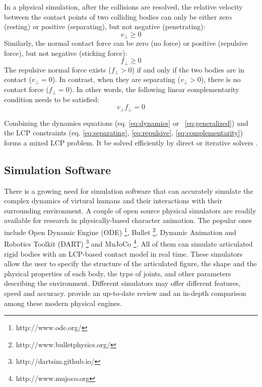 In a physical simulation, after the collisions are resolved, the relative velocity between the contact points of two colliding bodies can only be either zero (resting) or positive (separating), but not negative (penetrating):
\begin{equation}
v_\perp\geq 0
\label{eq:separating}
\end{equation}
Similarly, the normal contact force can be zero (no force) or positive (repulsive force), but not negative (sticking force):
\begin{equation}
f_\perp \geq 0
\label{eq:repulsive}
\end{equation}
The repulsive normal force exists ($f_\perp>0$) if and only if the two bodies are in contact ($v_\perp=0$). In contrast, when they are separating ($v_\perp>0$), there is no contact force ($f_\perp=0$).
In other words, the following linear complementarity condition needs to be satisfied:
\begin{equation}
v_\perp f_\perp =0
\label{eq:complementarity}
\end{equation}

Combining the dynamics equations (eq. \ref{eq:dynamics} or ~\ref{eq:generalized}) and the LCP constraints (eq. \ref{eq:separating}, \ref{eq:repulsive}, \ref{eq:complementarity}) forms a mixed LCP problem. It be solved efficiently by direct \cite{Lloyd05} or iterative solvers \cite{Erleben:2007,Kaufman:2008,Otaduy:2009}. 


\subsection{Simulation Software}

There is a growing need for simulation software that can accurately simulate the complex dynamics of virtural humans and their interactions with their surrounding environment. A couple of open source physical simulators are readily available for research in physically-based character animation. The popular ones include Open Dynamic Engine (ODE) \footnote{http://www.ode.org/}, Bullet \footnote{http://www.bulletphysics.org/}, Dynamic Animation and Robotics Toolkit (DART) \footnote{http://dartsim.github.io/} and MuJoCo \footnote{http://www.mujoco.org}. All of them can simulate articulated rigid bodies with an LCP-based contact model in real time. These simulators allow the user to specify the structure of the articulated figure, the shape and the physical properties of each body, the type of joints, and other parameters describing the environment. Different simulators may offer different features, speed and accuracy. \citet{ErezTT15} provide an up-to-date review and an in-depth comparison among these modern physical engines.
